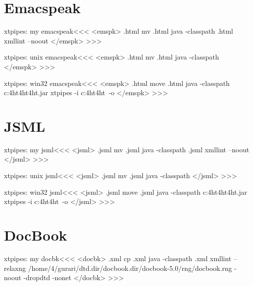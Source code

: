\documentclass{article}
\begin{document}
\section{Emacspeak}

\<xtpipes: my emacspeak\><<<
<emspk>
.html mv %
.html java -classpath %
.html xmllint --noout %
</emspk>
>>>


\<xtpipes: unix emacspeak\><<<
<emspk>
.html mv %
.html java -classpath  %
</emspk>
>>>


\<xtpipes: win32 emacspeak\><<<
<emspk>
.html move %
.html java -classpath  c:\tex4ht\texmf\tex4ht\bin\tex4ht.jar xtpipes -i c:\tex4ht\texmf\tex4ht\xtpipes\ -o %
</emspk>
>>>


\section{JSML}

\<xtpipes: my jsml\><<<
<jsml>
.jsml mv %
.jsml java -classpath %
.jsml xmllint --noout %
</jsml>
>>>


\<xtpipes: unix jsml\><<<
<jsml>
.jsml mv %
.jsml java -classpath %
</jsml>
>>>


\<xtpipes: win32 jsml\><<<
<jsml>
.jsml move %
.jsml java -classpath c:\tex4ht\texmf\tex4ht\bin\tex4ht.jar xtpipes -i c:\tex4ht\texmf\tex4ht\xtpipes\ -o %
</jsml>
>>>







\section{DocBook}

\<xtpipes: my docbk\><<<
<docbk>
.xml cp %
.xml java -classpath %
.xml xmllint --relaxng /home/4/gurari/dtd.dir/docbook.dir/docbook-5.0/rng/docbook.rng -noout -dropdtd -nonet %
</docbk>
>>>
\end{document}
